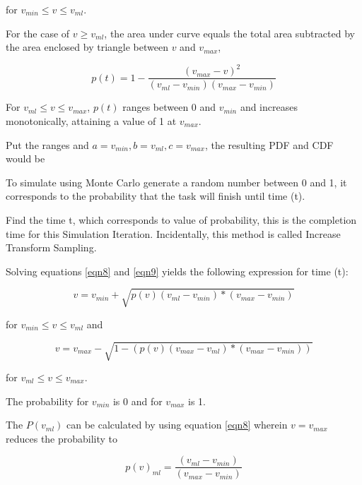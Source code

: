 for $ v_{min} \leqslant v \leqslant v_{ml}$.

For the case of $ v \geqslant v_{ml}$, the area under curve equals the total area subtracted by the area enclosed by triangle between $v$ and $v_{max}$,

\begin{equation}
p(t)  = 1 -  \frac{(v_{max} - v)^{2}}{ (v_{ml} - v_{min}) (v_{max} - v_{min}) } 
\label{eqn9}
\end{equation}

For $ v_{ml} \leqslant v \leqslant v_{max}$, $p(t)$ ranges between 0 and $v_{min}$ and increases monotonically, attaining a value of 1 at $v_{max}$. 

Put the ranges and $ a = v_{min}, b = v_{ml}, c = v_{max}$, the resulting PDF and CDF would be 





To simulate using Monte Carlo generate a random number between 0 and 1, it corresponds to the probability that the task will finish until time (t).

Find the time t, which corresponds to value of probability, this is the completion time for this Simulation Iteration. Incidentally, this method is called Increase Transform Sampling. 

Solving equations \ref{eqn8} and  \ref{eqn9} yields the following expression for time (t):

 \begin{equation}
 v = v_{min} + \sqrt{ p(v) (v_{ml} - v_{min}) * (v_{max} - v_{min})}
 \label{eqn10}
 \end{equation}
 
for $ v_{min} \leqslant v \leqslant v_{ml}$ and 

 \begin{equation}
v = v_{max} - \sqrt{1 - (p(v) (v_{max} - v_{ml}) * (v_{max} - v_{min}))}
\label{eqn10}
\end{equation}

for $ v_{ml} \leqslant v \leqslant v_{max}$. 

The probability for $v_{min}$ is 0 and for $v_{max}$ is 1. 

The $P(v_{ml})$ can be calculated by using equation \ref{eqn8} wherein $v = v_{max}$ reduces the probability to 

\begin{equation}
p(v)_{ml}  = \frac{(v_{ml} - v_{min})}{  (v_{max} - v_{min}) } 
\label{eqn11}
\end{equation}